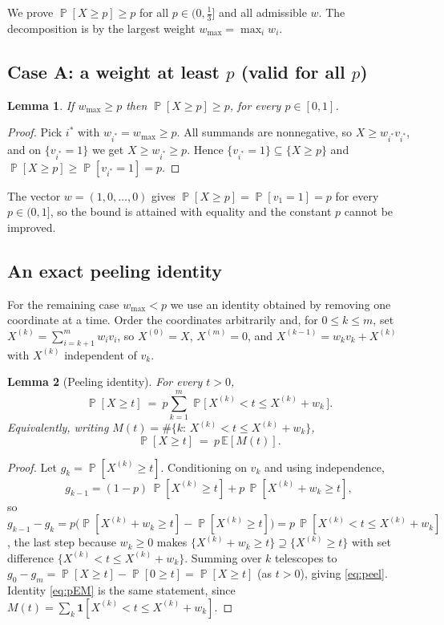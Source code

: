 \documentclass[11pt]{article}
\newtheorem{lemma}{Lemma}
\theoremstyle{definition}
\DeclareMathOperator{\PP}{\mathbb{P}}
\newcommand{\E}{\mathbb{E}}
\begin{document}
We prove $\PP[X\ge p]\ge p$ for all $p\in(0,\tfrac13]$ and all admissible $w$.
The decomposition is by the largest weight $w_{\max}=\max_i w_i$.

\subsection{Case A: a weight at least \texorpdfstring{$p$}{p} (valid for all $p$)}

\begin{lemma}\label{lem:caseA}
If $w_{\max}\ge p$ then $\PP[X\ge p]\ge p$, for every $p\in[0,1]$.
\end{lemma}

\begin{proof}
Pick $i^\ast$ with $w_{i^\ast}=w_{\max}\ge p$. All summands are nonnegative, so
$X\ge w_{i^\ast}v_{i^\ast}$, and on $\{v_{i^\ast}=1\}$ we get
$X\ge w_{i^\ast}\ge p$. Hence
$\{v_{i^\ast}=1\}\subseteq\{X\ge p\}$ and
$\PP[X\ge p]\ge\PP[v_{i^\ast}=1]=p$.
\end{proof}

The vector $w=(1,0,\dots,0)$ gives $\PP[X\ge p]=\PP[v_1=1]=p$ for every
$p\in(0,1]$, so the bound is attained with equality and the constant $p$ cannot
be improved.

\subsection{An exact peeling identity}

For the remaining case $w_{\max}<p$ we use an identity obtained by removing one
coordinate at a time. Order the coordinates arbitrarily and, for $0\le k\le m$,
set $X^{(k)}=\sum_{i=k+1}^m w_i v_i$, so $X^{(0)}=X$, $X^{(m)}=0$, and
$X^{(k-1)}=w_k v_k+X^{(k)}$ with $X^{(k)}$ independent of $v_k$.

\begin{lemma}[Peeling identity]\label{lem:peel}
For every $t>0$,
\begin{equation}\label{eq:peel}
\PP[X\ge t]\ =\ p\sum_{k=1}^m\PP\big[\,X^{(k)}<t\le X^{(k)}+w_k\,\big].
\end{equation}
Equivalently, writing $M(t)=\#\{k:\,X^{(k)}<t\le X^{(k)}+w_k\}$,
\begin{equation}\label{eq:pEM}
\PP[X\ge t]\ =\ p\,\E[M(t)].
\end{equation}
\end{lemma}

\begin{proof}
Let $g_k=\PP[X^{(k)}\ge t]$. Conditioning on $v_k$ and using independence,
\[
g_{k-1}=(1-p)\,\PP[X^{(k)}\ge t]+p\,\PP[X^{(k)}+w_k\ge t],
\]
so $g_{k-1}-g_k=p\big(\PP[X^{(k)}+w_k\ge t]-\PP[X^{(k)}\ge t]\big)
=p\,\PP[X^{(k)}<t\le X^{(k)}+w_k]$, the last step because $w_k\ge0$ makes
$\{X^{(k)}+w_k\ge t\}\supseteq\{X^{(k)}\ge t\}$ with set difference
$\{X^{(k)}<t\le X^{(k)}+w_k\}$. Summing over $k$ telescopes to
$g_0-g_m=\PP[X\ge t]-\PP[0\ge t]=\PP[X\ge t]$ (as $t>0$), giving
\eqref{eq:peel}. Identity \eqref{eq:pEM} is the same statement, since
$M(t)=\sum_{k}\mathbf 1[X^{(k)}<t\le X^{(k)}+w_k]$.
\end{proof}
\end{document}
